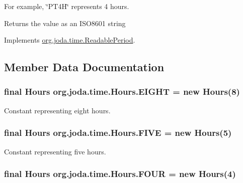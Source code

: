 For example, \char`\"{}\-P\-T4\-H\char`\"{} represents 4 hours.

\begin{DoxyReturn}{Returns}
the value as an I\-S\-O8601 string 
\end{DoxyReturn}


Implements \hyperlink{interfaceorg_1_1joda_1_1time_1_1_readable_period_a6040c2282959a2d2f6694421591ad0f2}{org.\-joda.\-time.\-Readable\-Period}.



\subsection{Member Data Documentation}
\hypertarget{classorg_1_1joda_1_1time_1_1_hours_ad257dbcbf4ab2e0afaffa2c84603652a}{
\subsubsection[{E\-I\-G\-H\-T}]{\setlength{\rightskip}{0pt plus 5cm}final {\bf Hours} org.\-joda.\-time.\-Hours.\-E\-I\-G\-H\-T = new {\bf Hours}(8)\hspace{0.3cm}{\ttfamily [static]}}}\label{classorg_1_1joda_1_1time_1_1_hours_ad257dbcbf4ab2e0afaffa2c84603652a}
Constant representing eight hours. \hypertarget{classorg_1_1joda_1_1time_1_1_hours_a3c261095bfcb12132ca23f1954d473d0}{
\subsubsection[{F\-I\-V\-E}]{\setlength{\rightskip}{0pt plus 5cm}final {\bf Hours} org.\-joda.\-time.\-Hours.\-F\-I\-V\-E = new {\bf Hours}(5)\hspace{0.3cm}{\ttfamily [static]}}}\label{classorg_1_1joda_1_1time_1_1_hours_a3c261095bfcb12132ca23f1954d473d0}
Constant representing five hours. \hypertarget{classorg_1_1joda_1_1time_1_1_hours_a464b11ca82a7f8ec2d1432fb86459c6c}{
\subsubsection[{F\-O\-U\-R}]{\setlength{\rightskip}{0pt plus 5cm}final {\bf Hours} org.\-joda.\-time.\-Hours.\-F\-O\-U\-R = new {\bf Hours}(4)\hspace{0.3cm}{\ttfamily [static]}}}\label{classorg_1_1joda_1_1time_1_1_hours_a464b11ca82a7f8ec2d1432fb86459c6c}
